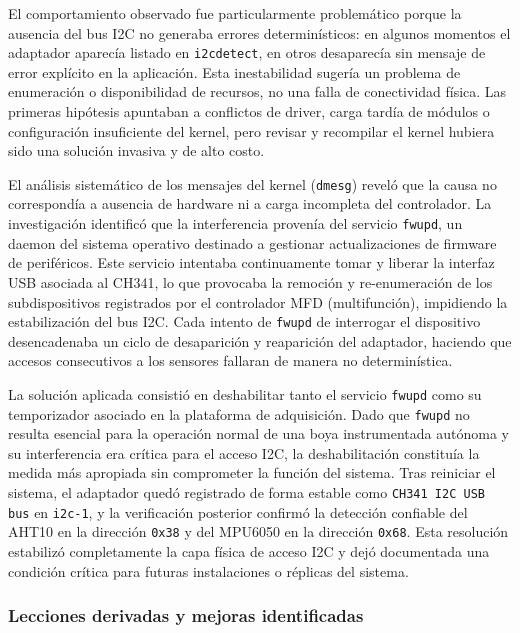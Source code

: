 El comportamiento observado fue particularmente problemático porque la ausencia del bus I2C no generaba errores determinísticos: en algunos momentos el adaptador aparecía listado en \texttt{i2cdetect}, en otros desaparecía sin mensaje de error explícito en la aplicación. Esta inestabilidad sugería un problema de enumeración o disponibilidad de recursos, no una falla de conectividad física. Las primeras hipótesis apuntaban a conflictos de driver, carga tardía de módulos o configuración insuficiente del kernel, pero revisar y recompilar el kernel hubiera sido una solución invasiva y de alto costo.

El análisis sistemático de los mensajes del kernel (\texttt{dmesg}) reveló que la causa no correspondía a ausencia de hardware ni a carga incompleta del controlador. La investigación identificó que la interferencia provenía del servicio \texttt{fwupd}, un daemon del sistema operativo destinado a gestionar actualizaciones de firmware de periféricos. Este servicio intentaba continuamente tomar y liberar la interfaz USB asociada al CH341, lo que provocaba la remoción y re-enumeración de los subdispositivos registrados por el controlador MFD (multifunción), impidiendo la estabilización del bus I2C. Cada intento de \texttt{fwupd} de interrogar el dispositivo desencadenaba un ciclo de desaparición y reaparición del adaptador, haciendo que accesos consecutivos a los sensores fallaran de manera no determinística.

La solución aplicada consistió en deshabilitar tanto el servicio \texttt{fwupd} como su temporizador asociado en la plataforma de adquisición. Dado que \texttt{fwupd} no resulta esencial para la operación normal de una boya instrumentada autónoma y su interferencia era crítica para el acceso I2C, la deshabilitación constituía la medida más apropiada sin comprometer la función del sistema. Tras reiniciar el sistema, el adaptador quedó registrado de forma estable como \texttt{CH341 I2C USB bus} en \texttt{i2c-1}, y la verificación posterior confirmó la detección confiable del AHT10 en la dirección \texttt{0x38} y del MPU6050 en la dirección \texttt{0x68}. Esta resolución estabilizó completamente la capa física de acceso I2C y dejó documentada una condición crítica para futuras instalaciones o réplicas del sistema.

\subsubsection*{Lecciones derivadas y mejoras identificadas}

